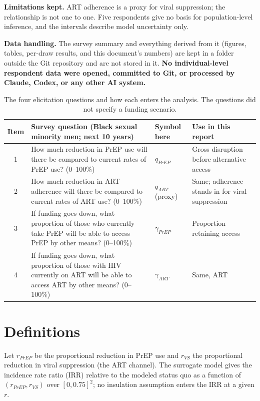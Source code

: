 \documentclass[10pt,a4paper]{article}
\begin{document}
\textbf{Limitations kept.} ART adherence is a proxy for viral suppression; the relationship is not one to one. Five respondents give no basis for population-level inference, and the intervals describe model uncertainty only.

\textbf{Data handling.} The survey summary and everything derived from it (figures, tables, per-draw results, and this document's numbers) are kept in a folder outside the Git repository and are not stored in it. \textbf{No individual-level respondent data were opened, committed to Git, or processed by Claude, Codex, or any other AI system.}

\begin{table}[htbp]\centering\small
\begin{tabular}{@{}c>{\raggedright\arraybackslash}p{6.4cm}>{\raggedright\arraybackslash}p{2.3cm}>{\raggedright\arraybackslash}p{4.4cm}@{}}\toprule
Item & Survey question (Black sexual minority men; next 10 years) & Symbol here & Use in this report\\\midrule
1 & How much reduction in PrEP use will there be compared to current rates of PrEP use? (0--100\%) & $q_{PrEP}$ & Gross disruption before alternative access\\
2 & How much reduction in ART adherence will there be compared to current rates of ART use? (0--100\%) & $q_{ART}$ (proxy) & Same; adherence stands in for viral suppression\\
3 & If funding goes down, what proportion of those who currently take PrEP will be able to access PrEP by other means? (0--100\%) & $\gamma_{PrEP}$ & Proportion retaining access\\
4 & If funding goes down, what proportion of those with HIV currently on ART will be able to access ART by other means? (0--100\%) & $\gamma_{ART}$ & Same, ART\\\bottomrule
\end{tabular}
\caption{The four elicitation questions and how each enters the analysis. The questions did not specify a funding scenario.}\label{tab:survey}
\end{table}

\section{Definitions}
Let $r_{PrEP}$ be the proportional reduction in PrEP use and $r_{VS}$ the proportional reduction in viral suppression (the ART channel). The surrogate model gives the incidence rate ratio (IRR) relative to the modeled status quo as a function of $(r_{PrEP},r_{VS})$ over $[0,0.75]^2$; no insulation assumption enters the IRR at a given $r$.
\end{document}
